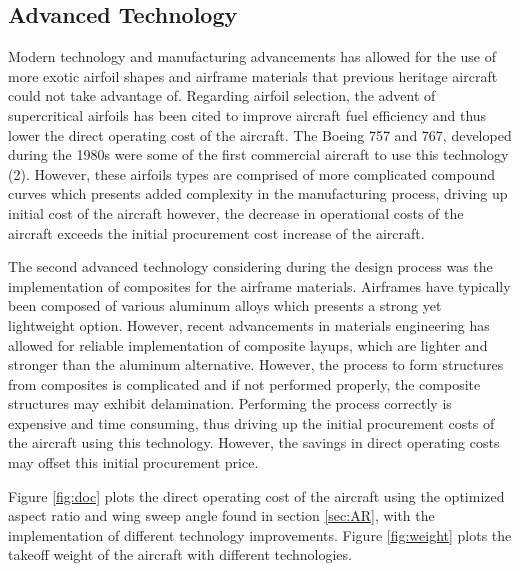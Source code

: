 \documentclass{article}
\begin{document}
    \subsection{Advanced Technology}
    \label{sec:adv_tech}
        \begin{flushleft}
            Modern technology and manufacturing advancements has allowed for the
            use of more exotic airfoil shapes and airframe materials that
            previous heritage aircraft could not take advantage of. Regarding
            airfoil selection, the advent of supercritical airfoils has been
            cited to improve aircraft fuel efficiency and thus lower the direct
            operating cost of the aircraft. The Boeing 757 and 767, developed
            during the 1980s were some of the first commercial aircraft to use
            this technology (2). However, these airfoils types are comprised of more
            complicated compound curves which presents added complexity in the
            manufacturing process, driving up initial cost of the aircraft
            however, the decrease in operational costs of the aircraft exceeds
            the initial procurement cost increase of the aircraft.

            The second advanced technology considering during the design process
            was the implementation of composites for the airframe materials.
            Airframes have typically been composed of various aluminum alloys
            which presents a strong yet lightweight option. However, recent
            advancements in materials engineering has allowed for reliable
            implementation of composite layups, which are lighter and stronger
            than the aluminum alternative. However, the process to form
            structures from composites is complicated and if not performed
            properly, the composite structures may exhibit delamination.
            Performing the process correctly is expensive and time consuming,
            thus driving up the initial procurement costs of the aircraft using
            this technology. However, the savings in direct operating costs may
            offset this initial procurement price.

            Figure \ref{fig:doc} plots the direct operating cost of the aircraft
            using the optimized aspect ratio and wing sweep angle found in
            section \ref{sec:AR}, with the implementation of different
            technology improvements. Figure \ref{fig:weight} plots the takeoff weight of
            the aircraft with different technologies.
        \end{flushleft}
\end{document}
